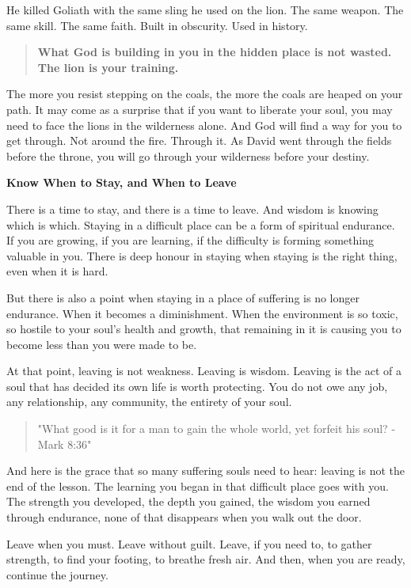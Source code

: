 He killed Goliath with the same sling he used on the lion. The same
weapon. The same skill. The same faith. Built in obscurity. Used in
history.

\begin{quote}
\textbf{What God is building in you in the hidden place is not wasted.
The lion is your training.}
\end{quote}

The more you resist stepping on the coals, the more the coals are heaped
on your path. It may come as a surprise that if you want to liberate
your soul, you may need to face the lions in the wilderness alone. And
God will find a way for you to get through. Not around the fire. Through
it. As David went through the fields before the throne, you will go
through your wilderness before your destiny.

\textbf{Know When to Stay, and When to Leave}

There is a time to stay, and there is a time to leave. And wisdom is
knowing which is which. Staying in a difficult place can be a form of
spiritual endurance. If you are growing, if you are learning, if the
difficulty is forming something valuable in you. There is deep honour in
staying when staying is the right thing, even when it is hard.

But there is also a point when staying in a place of suffering is no
longer endurance. When it becomes a diminishment. When the environment
is so toxic, so hostile to your soul's health and growth, that remaining
in it is causing you to become less than you were made to be.

At that point, leaving is not weakness. Leaving is wisdom. Leaving is
the act of a soul that has decided its own life is worth protecting. You
do not owe any job, any relationship, any community, the entirety of
your soul.

\begin{quote}
"What good is it for a man to gain the whole world, yet forfeit his
soul? - Mark 8:36"
\end{quote}

And here is the grace that so many suffering souls need to hear: leaving
is not the end of the lesson. The learning you began in that difficult
place goes with you. The strength you developed, the depth you gained,
the wisdom you earned through endurance, none of that disappears when
you walk out the door.

Leave when you must. Leave without guilt. Leave, if you need to, to
gather strength, to find your footing, to breathe fresh air. And then,
when you are ready, continue the journey.

